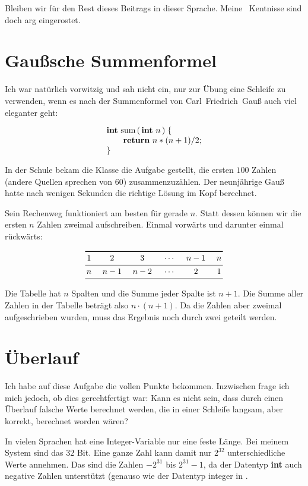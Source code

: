 \noindent Bleiben wir für den Rest dieses Beitrags in dieser Sprache.
Meine \modula\ Kentnisse sind doch arg eingerostet.

\section{Gaußsche Summenformel}%
%
Ich war natürlich vorwitzig und sah nicht ein,
nur zur Übung eine Schleife zu verwenden,
wenn es nach der Summenformel von Carl~Friedrich~Gauß auch viel eleganter
geht:

$$\vbox{\halign{#\hfil\cr
{\bf int} sum$\,(\,${\bf int} $n\,)\;\{$\cr
\qquad{\bf return} $n * (n + 1) / 2$;\cr
$\}$\cr}}$$

\noindent In der Schule bekam die Klasse die Aufgabe gestellt, die ersten $100$ Zahlen
(andere Quellen sprechen von $60$) zusammenzuzählen.
Der neunjährige Gauß hatte nach wenigen Sekunden die richtige Lösung im Kopf
berechnet.

Sein Rechenweg funktioniert am besten für gerade $n$.
Statt dessen können wir die ersten $n$ Zahlen zweimal aufschreiben.
Einmal vorwärts und darunter einmal rückwärts:

$$\vbox{\halign{\hfil$\,$#$\,$\hfil&&\quad\hfil$\,$#$\,$\hfil\cr
\noalign{\hrule height1pt\smallskip}
$1$&$2$&$3$&$\mathstrut\cdots$&$n-1$&$n$\cr
\noalign{\smallskip\hrule\smallskip}
$n$&$n-1$&$n-2$&$\mathstrut\cdots$&$2$&$1$\cr
\noalign{\smallskip\hrule}}}$$

\noindent Die Tabelle hat $n$ Spalten und die Summe jeder Spalte ist $n+1$.
Die Summe aller Zahlen in der Tabelle beträgt also $n\cdot(n+1)$.
Da die Zahlen aber zweimal aufgeschrieben wurden, muss das
Ergebnis noch durch zwei geteilt werden.

\section{Überlauf}%
%
Ich habe auf diese Aufgabe die vollen Punkte bekommen.
Inzwischen frage ich mich jedoch, ob dies gerechtfertigt war:
Kann es nicht sein, dass durch einen Überlauf falsche Werte
berechnet werden, die in einer Schleife langsam, aber korrekt,
berechnet worden wären?

In vielen Sprachen hat eine Integer-Variable nur eine feste Länge.
Bei meinem System sind das $32$ Bit.
Eine ganze Zahl kann damit nur $2^{32}$ unterschiedliche Werte annehmen.
Das sind die Zahlen $-2^{31}$ bis $2^{31}-1$, da der Datentyp {\bf int}
auch negative Zahlen unterstützt
(genauso wie der Datentyp {\bsf integer}
in \modula.

